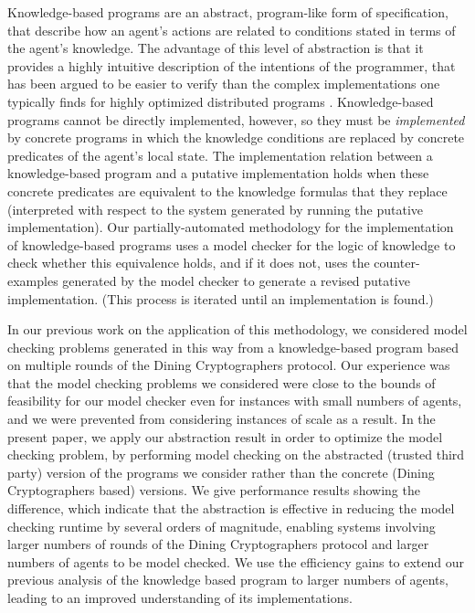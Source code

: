 \documentclass[]{llncs}
\begin{document}
Knowledge-based programs \cite{FHMVbook} are an abstract, program-like form of specification, 
that describe how an agent's actions are related to conditions stated in terms of the agent's knowledge. The advantage of this 
level of abstraction is that it provides a highly intuitive description of the intentions 
of the programmer, that has been argued to be easier to verify than the complex 
implementations one typically finds for highly optimized distributed programs \cite{HZ92,FHMVbook}. 
Knowledge-based programs cannot be directly implemented, however, so they 
must be {\em implemented} by concrete programs in which the 
knowledge  conditions are replaced by concrete predicates of the agent's local state. 
The implementation relation between a knowledge-based program and a putative implementation 
holds when these concrete predicates are equivalent to the knowledge formulas that 
they replace (interpreted with respect to the system generated by running the putative implementation). 
Our partially-automated methodology for the implementation of knowledge-based programs 
uses a model checker for the logic of knowledge  to check whether this equivalence holds, 
and if it does not, uses the counter-examples generated by the model checker to 
generate a revised putative implementation. (This process is iterated until an implementation is found.) 

In our previous work on the application of this methodology, we considered 
model checking problems generated in this way from a knowledge-based 
program based on multiple rounds of the Dining Cryptographers protocol. 
Our experience was that the model checking problems we considered  
were close to the bounds of feasibility for our model checker even for instances with 
small numbers of agents, and we were prevented from considering instances of scale as a result. 
In the present paper, we apply our abstraction result in order to optimize the 
model checking problem, by performing model checking on the abstracted 
(trusted third party) version of the programs we consider rather than the concrete 
(Dining Cryptographers based) versions.  We give performance results
showing the difference, which indicate that the abstraction is effective in 
reducing the model checking runtime by several  orders of magnitude, enabling 
systems involving larger numbers of rounds of the  Dining Cryptographers protocol
and larger numbers of agents to be model checked. We use the efficiency gains to extend 
our previous analysis of the knowledge based program to larger numbers of agents, 
leading to an improved understanding of its implementations. 
\end{document}

